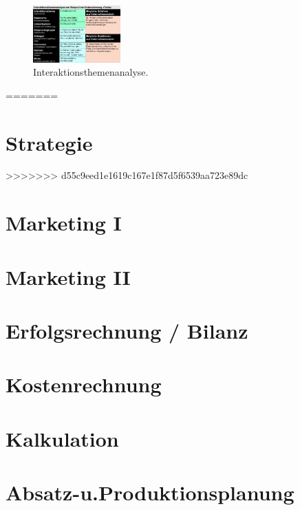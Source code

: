 \documentclass{article}
\begin{document}
\begin{figure}[H]
\centering
\includegraphics[width=0.3\textwidth]{Resources/Image/Interaktionsthemenanalyse.png}
\caption{\label{fig:Interaktionsthemenanalyse}Interaktionsthemenanalyse.}
\end{figure}
=======
\section{Strategie}

>>>>>>> d55c9eed1e1619c167e1f87d5f6539aa723e89dc

\pagebreak
\section{Marketing I}



\section{Marketing II}




\section{Erfolgsrechnung / Bilanz}


\section{Kostenrechnung}




\section{Kalkulation}



\section{Absatz-u.Produktionsplanung}

\end{document}
